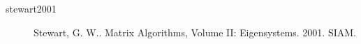 \begin{description}
\item[stewart2001] Stewart, G. W.. Matrix Algorithms, Volume II: Eigensystems. 2001. SIAM.
\end{description}
